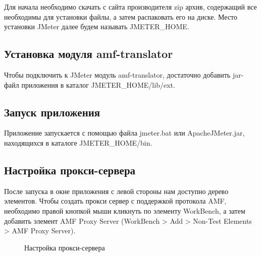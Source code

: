 Для начала необходимо скачать с сайта производителя zip архив, содержащий все необходимы для установки файлы,
а затем распаковать его на диске. Место установки JMeter далее будем называть JMETER\_HOME.

\subsection{Установка модуля amf-translator}

Чтобы подключить к JMeter модуль amf-translator, достаточно добавить jar-файл приложения в каталог JMETER\_HOME/lib/ext.

\subsection{Запуск приложения}

Приложение запускается с помощью файла jmeter.bat или ApacheJMeter.jar, находящихся в каталоге JMETER\_HOME/bin.

\subsection{Настройка прокси-сервера}

После запуска в окне приложения с левой стороны нам доступно дерево элементов. Чтобы создать прокси сервер
с поддержкой протокола AMF, необходимо правой кнопкой мыши кликнуть по элементу WorkBench,
а затем добавить элемент AMF Proxy Server (WorkBench > Add > Non-Test Elements > AMF Proxy Server).

\begin{figure}[ht]
\caption{Настройка прокси-сервера}
\label{ris:proxySettings.png}
\end{figure}


